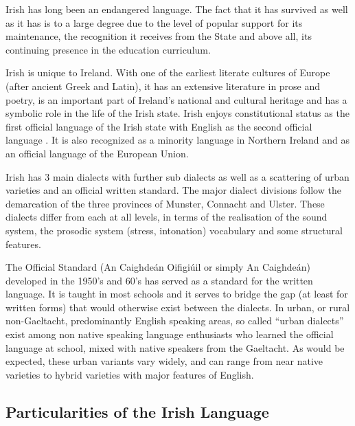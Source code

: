 \begin{multicols}{2}
Irish has long been an endangered language. The fact that it has survived as well as it has is to a large degree due to the level of popular support for its maintenance, the recognition it receives from the State and above all, its continuing presence in the education curriculum.


Irish is unique to Ireland. With one of the earliest literate cultures of Europe (after ancient Greek and Latin), it has an extensive literature in prose and poetry, is an important part of  Ireland’s national and cultural heritage and has a symbolic role in the life of the Irish state. Irish enjoys constitutional status as the first official language of the Irish state with English as the second official language \cite{govtstatement06} \cite{20yearstrategy}. It is also recognized as a minority language in Northern Ireland and as an official language of the European Union.

Irish has 3 main dialects with further sub dialects as well as a scattering of urban varieties and an official written standard. The major dialect divisions follow the demarcation of the three provinces of Munster, Connacht and Ulster. These dialects differ from each at all levels, in terms of the realisation of the sound system,  the prosodic system (stress, intonation) vocabulary and some structural features. 

The Official Standard (An Caighdeán Oifigiúil or simply An Caighdeán) developed in the 1950’s and 60’s has served as a standard for the written language. It is taught in most schools and it serves to bridge the gap (at least for written forms) that would otherwise exist between the dialects. In urban, or rural non-Gaeltacht, predominantly English speaking areas, so called ``urban dialects'' exist among non native speaking language enthusiasts who learned the official language at school, mixed with native speakers from the Gaeltacht. As would be expected, these urban variants vary widely, and can range from near native varieties to hybrid varieties with major features of English. 



\subsection{Particularities of the Irish Language}
\label{AboutIrish_en}


\end{multicols}
